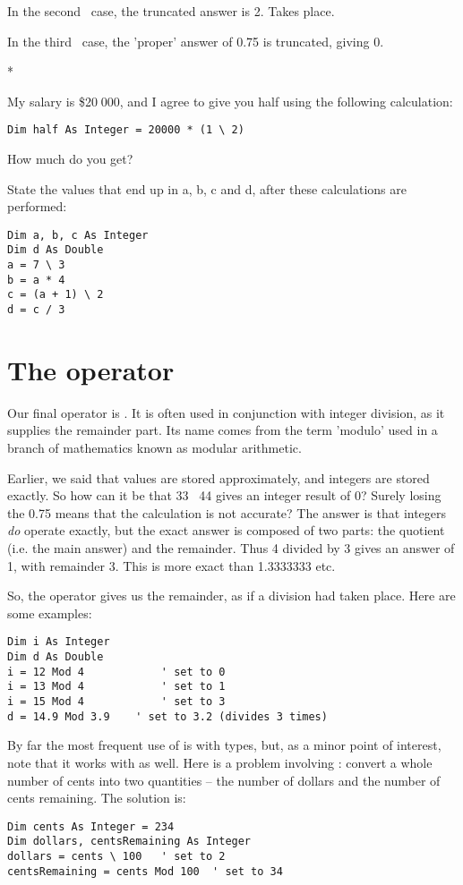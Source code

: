 In the second \ case, the truncated answer is 2. Takes place.

In the third \ case, the 'proper' answer of 0.75 is truncated, giving 0.


		\begin{stqb}*
			\begin{STQ}
				\item	My salary is \$20 000, and I agree to give you half using the following calculation:
					\begin{lstlisting}
Dim half As Integer = 20000 * (1 \ 2)
					\end{lstlisting}
					How much do you get?
				\item State the values that end up in a, b, c and d, after these calculations are performed:
					\begin{lstlisting}
Dim a, b, c As Integer
Dim d As Double
a = 7 \ 3
b = a * 4
c = (a + 1) \ 2
d = c / 3
					\end{lstlisting}
			\end{STQ}
		\end{stqb}

	\section{The  operator}
		Our final operator is . It is often used in conjunction with integer division, as it supplies the remainder part. Its name comes from the term 'modulo' used in a branch of mathematics known as modular arithmetic.
			
		Earlier, we said that  values are stored approximately, and integers are stored exactly. So how can it be that 33 \ 44 gives an integer result of 0? Surely losing the 0.75 means that the calculation is not accurate? The answer is that integers \emph{do} operate exactly, but the exact answer is composed of two parts: the quotient (i.e. the main answer) and the remainder. Thus 4 divided by 3 gives an answer of 1, with remainder 3. This is more exact than 1.3333333 etc.

		So, the  operator gives us the remainder, as if a division had taken place. Here are some examples:
		\begin{lstlisting}
Dim i As Integer
Dim d As Double
i = 12 Mod 4 			' set to 0
i = 13 Mod 4 			' set to 1
i = 15 Mod 4 			' set to 3
d = 14.9 Mod 3.9 	' set to 3.2 (divides 3 times)
		\end{lstlisting}
		By far the most frequent use of  is with  types, but, as a minor point of interest, note that it works with  as well. Here is a problem involving : convert a whole number of cents into two quantities – the number of dollars and the number of cents remaining. The solution is:
		\begin{lstlisting}
Dim cents As Integer = 234
Dim dollars, centsRemaining As Integer
dollars = cents \ 100	' set to 2
centsRemaining = cents Mod 100	' set to 34
		\end{lstlisting}


